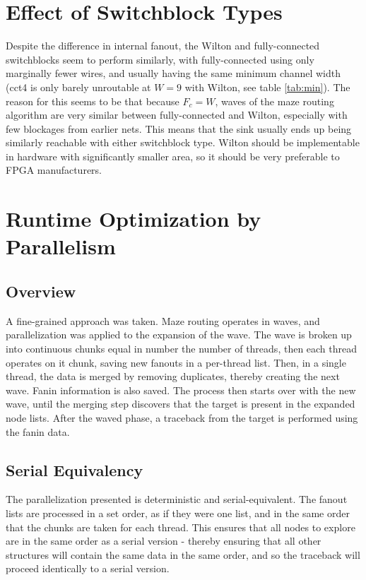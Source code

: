 \documentclass[11pt]{article}
\begin{document}
\section{Effect of Switchblock Types}
Despite the difference in internal fanout, the Wilton and fully-connected switchblocks seem to perform similarly, with fully-connected using only marginally fewer wires, and usually having the same minimum channel width (cct4 is only barely unroutable at \( W=9 \) with Wilton, see table \ref{tab:min}). The reason for this seems to be that because \( F_c = W \), waves of the maze routing algorithm are very similar between fully-connected and Wilton, especially with few blockages from earlier nets. This means that the sink usually ends up being similarly reachable with either switchblock type. Wilton should be implementable in hardware with significantly smaller area, so it should be very preferable to FPGA manufacturers.

\section{Runtime Optimization by Parallelism}
\subsection{Overview}\label{sec:para-overview}
A fine-grained approach was taken. Maze routing operates in waves, and parallelization was applied to the expansion of the wave. The wave is broken up into continuous chunks equal in number the number of threads, then each thread operates on it chunk, saving new fanouts in a per-thread list. Then, in a single thread, the data is merged by removing duplicates, thereby creating the next wave. Fanin information is also saved. The process then starts over with the new wave, until the merging step discovers that the target is present in the expanded node lists. After the waved phase, a traceback from the target is performed using the fanin data.

\subsection{Serial Equivalency}\label{sec:serial-equiv}
The parallelization presented is deterministic and serial-equivalent. The fanout lists are processed in a set order, as if they were one list, and in the same order that the chunks are taken for each thread. This ensures that all nodes to explore are in the same order as a serial version - thereby ensuring that all other structures will contain the same data in the same order, and so the traceback will proceed identically to a serial version.
\end{document}
